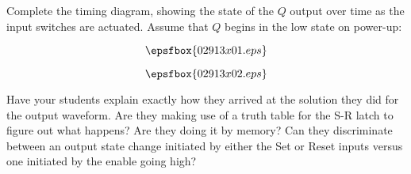 

Complete the timing diagram, showing the state of the $Q$ output over time as the input switches are actuated.  Assume that $Q$ begins in the low state on power-up:

$$\epsfbox{02913x01.eps}$$







$$\epsfbox{02913x02.eps}$$







Have your students explain exactly how they arrived at the solution they did for the output waveform.  Are they making use of a truth table for the S-R latch to figure out what happens?  Are they doing it by memory?  Can they discriminate between an output state change initiated by either the Set or Reset inputs versus one initiated by the enable going high?




